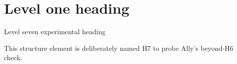 \documentclass[11pt]{article}
\begin{document}
\section{Level one heading}
\tagmcbegin{}Level seven experimental heading\tagmcend\tagstructend

This structure element is deliberately named H7 to probe Ally's beyond-H6 check.
\end{document}
